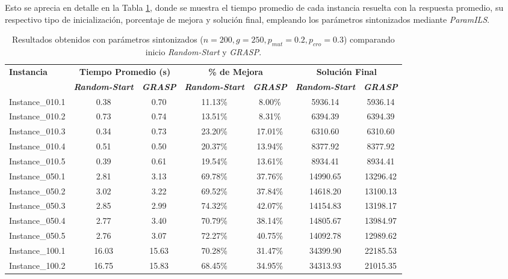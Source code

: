 Esto se aprecia en detalle en la Tabla \ref{tab:resultados_tuneados}, donde se muestra el tiempo promedio de cada instancia resuelta con la respuesta promedio, su respectivo tipo de inicialización, porcentaje de mejora y solución final, empleando los parámetros sintonizados mediante \textit{ParamILS}.

\begin{table}[htbp]
\centering
\footnotesize
\setlength{\tabcolsep}{4.5pt}
\caption{Resultados obtenidos con parámetros sintonizados ($n=200, g=250, p_{mut}=0.2, p_{cro}=0.3$) comparando inicio \textit{Random-Start} y \textit{GRASP}.}
\label{tab:resultados_tuneados}
\begin{tabular}{lcccccc}
\toprule
\multirow{2}{*}{\textbf{Instancia}} & \multicolumn{2}{c}{\textbf{Tiempo Promedio (s)}} & \multicolumn{2}{c}{\textbf{\% de Mejora}} & \multicolumn{2}{c}{\textbf{Solución Final}} \\
\cmidrule(lr){2-3} \cmidrule(lr){4-5} \cmidrule(lr){6-7}
 & \textbf{\textit{Random-Start}} & \textbf{\textit{GRASP}} & \textbf{\textit{Random-Start}} & \textbf{\textit{GRASP}} & \textbf{\textit{Random-Start}} & \textbf{\textit{GRASP}} \\
\midrule
Instance\_010.1 & 0.38 & 0.70 & 11.13\% & 8.00\% & 5936.14 & 5936.14 \\
Instance\_010.2 & 0.73 & 0.74 & 13.51\% & 8.31\% & 6394.39 & 6394.39 \\
Instance\_010.3 & 0.34 & 0.73 & 23.20\% & 17.01\% & 6310.60 & 6310.60 \\
Instance\_010.4 & 0.51 & 0.50 & 20.37\% & 13.94\% & 8377.92 & 8377.92 \\
Instance\_010.5 & 0.39 & 0.61 & 19.54\% & 13.61\% & 8934.41 & 8934.41 \\
\midrule
Instance\_050.1 & 2.81 & 3.13 & 69.78\% & 37.76\% & 14990.65 & 13296.42 \\
Instance\_050.2 & 3.02 & 3.22 & 69.52\% & 37.84\% & 14618.20 & 13100.13 \\
Instance\_050.3 & 2.85 & 2.99 & 74.32\% & 42.07\% & 14154.83 & 13198.17 \\
Instance\_050.4 & 2.77 & 3.40 & 70.79\% & 38.14\% & 14805.67 & 13984.97 \\
Instance\_050.5 & 2.76 & 3.07 & 72.27\% & 40.75\% & 14092.78 & 12989.62 \\
\midrule
Instance\_100.1 & 16.03 & 15.63 & 70.28\% & 31.47\% & 34399.90 & 22185.53 \\
Instance\_100.2 & 16.75 & 15.83 & 68.45\% & 34.95\% & 34313.93 & 21015.35 \\

\end{tabular}
\end{table}
